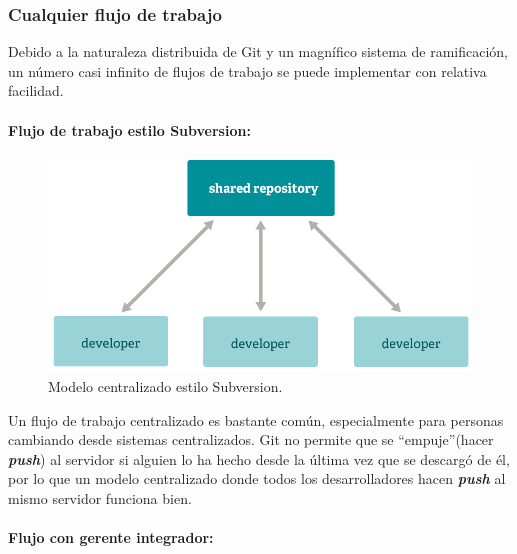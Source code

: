 \documentclass[12pt, spanish, oneside, onecolumn, a4paper]{report}
\begin{document}
\clearpage
\subsubsection{Cualquier flujo de trabajo}
\label{sec:anyworkflow}

Debido a la naturaleza distribuida de Git y un magnífico sistema de ramificación, un número casi infinito de flujos de trabajo se puede implementar con relativa facilidad.



\paragraph{Flujo de trabajo estilo Subversion:}


\begin{figure}
  \begin{center}
    \includegraphics[width=.6\textwidth,keepaspectratio=true]{workflow-a.png}
  \end{center}
  \caption{Modelo centralizado estilo Subversion.}
\end{figure}
Un flujo de trabajo centralizado es bastante común, especialmente para personas cambiando desde sistemas centralizados. Git no permite que se ``empuje''(hacer \textbf{\emph{push}}) al servidor si alguien lo ha hecho desde la última vez que se descargó de él, por lo que un modelo centralizado donde todos los desarrolladores hacen \textbf{\emph{push}} al mismo servidor funciona bien.


\paragraph{Flujo con gerente integrador:}
\end{document}
